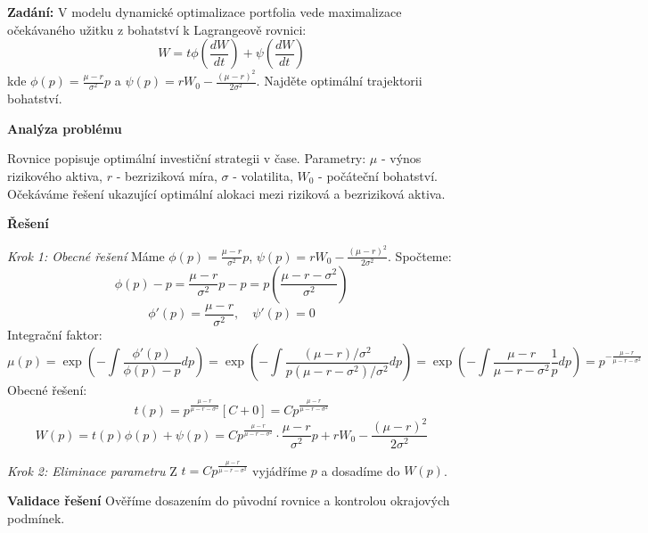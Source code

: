 \begin{example}
\label{ex:optimalni-portfolio}

\noindent\textbf{Zadání:} V modelu dynamické optimalizace portfolia vede maximalizace očekávaného užitku z bohatství k Lagrangeově rovnici:
\[
W = t\phi\left(\frac{dW}{dt}\right) + \psi\left(\frac{dW}{dt}\right)
\]
kde $\phi(p) = \frac{\mu - r}{\sigma^2}p$ a $\psi(p) = rW_0 - \frac{(\mu-r)^2}{2\sigma^2}$. Najděte optimální trajektorii bohatství.

\vspace{1.5\baselineskip}

\noindent\textbf{Analýza problému}

Rovnice popisuje optimální investiční strategii v čase. Parametry: $\mu$ - výnos rizikového aktiva, $r$ - bezriziková míra, $\sigma$ - volatilita, $W_0$ - počáteční bohatství. Očekáváme řešení ukazující optimální alokaci mezi riziková a bezriziková aktiva.

\vspace{1.5\baselineskip}

\noindent\textbf{Řešení}

\noindent\textit{Krok 1: Obecné řešení}
Máme $\phi(p) = \frac{\mu - r}{\sigma^2}p$, $\psi(p) = rW_0 - \frac{(\mu-r)^2}{2\sigma^2}$. Spočteme:
\[
\phi(p) - p = \frac{\mu - r}{\sigma^2}p - p = p\left(\frac{\mu - r - \sigma^2}{\sigma^2}\right)
\]
\[
\phi'(p) = \frac{\mu - r}{\sigma^2}, \quad \psi'(p) = 0
\]
Integrační faktor:
\[
\mu(p) = \exp\left(-\int \frac{\phi'(p)}{\phi(p)-p} dp\right) = \exp\left(-\int \frac{(\mu-r)/\sigma^2}{p(\mu-r-\sigma^2)/\sigma^2} dp\right) = \exp\left(-\int \frac{\mu-r}{\mu-r-\sigma^2} \frac{1}{p} dp\right) = p^{-\frac{\mu-r}{\mu-r-\sigma^2}}
\]
Obecné řešení:
\[
t(p) = p^{\frac{\mu-r}{\mu-r-\sigma^2}} \left[ C + 0 \right] = C p^{\frac{\mu-r}{\mu-r-\sigma^2}}
\]
\[
W(p) = t(p)\phi(p) + \psi(p) = C p^{\frac{\mu-r}{\mu-r-\sigma^2}} \cdot \frac{\mu-r}{\sigma^2}p + rW_0 - \frac{(\mu-r)^2}{2\sigma^2}
\]

\vspace{1\baselineskip}

\noindent\textit{Krok 2: Eliminace parametru}
Z $t = C p^{\frac{\mu-r}{\mu-r-\sigma^2}}$ vyjádříme $p$ a dosadíme do $W(p)$.

\vspace{1.5\baselineskip}

\noindent\textbf{Validace řešení}
Ověříme dosazením do původní rovnice a kontrolou okrajových podmínek.


\end{example}
